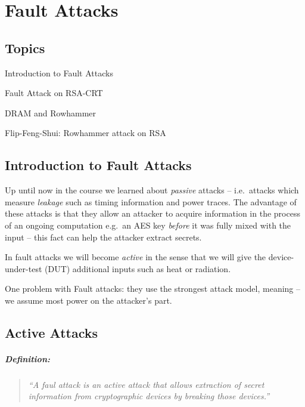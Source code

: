 \chapter{Fault Attacks}\label{cha:c9_ninthchapter}

\begin{centering}
	\section*{Topics}\label{sec:topics}
		\begin{enumerate}
		\end{enumerate}
\end{centering}
\newpage

\section*{Introduction to Fault Attacks}\label{sec:introduction_to_fault_attacks}
Up until now in the course we learned about \emph{passive} attacks -- i.e.\ attacks which measure \emph{leakage} such as timing information and power traces. The advantage of these attacks is that they allow an attacker to acquire information in the process of an ongoing computation e.g.\ an AES key \emph{before} it was fully mixed with the input -- this fact can help the attacker extract secrets.

In fault attacks we will become \emph{active} in the sense that we will give the device-under-test (DUT) additional inputs such as heat or radiation.

One problem with Fault attacks: they use the strongest attack model, meaning -- we assume most power on the attacker's part.

\section{Active Attacks}\label{sec:active_attacks}
\paragraph{Definition:}
\begin{quote}
	\textit{``A faul attack is an active attack that allows extraction of secret information from cryptographic devices by breaking those devices.''}
\end{quote}

